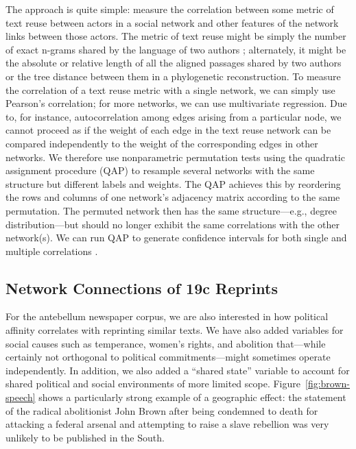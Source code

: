 \documentclass[pdftex,11pt]{article}
\begin{document}
The approach is quite simple: measure the correlation between some
metric of text reuse between actors in a social network and other
features of the network links between those actors.  The metric of
text reuse might be simply the number of exact n-grams shared by the
language of two authors \cite{margolin13:_why_simil}; alternately, it
might be the absolute or relative length of all the aligned passages
shared by two authors or the tree distance between them in a
phylogenetic reconstruction.  To measure the correlation of a text
reuse metric with a single network, we can simply use Pearson's
correlation; for more networks, we can use multivariate regression.
Due to, for instance, autocorrelation among edges arising from a
particular node, we cannot proceed as if the weight of each edge in
the text reuse network can be compared independently to the weight of
the corresponding edges in other networks.  We therefore use
nonparametric permutation tests using the quadratic assignment
procedure (QAP) to resample several networks with the same structure
but different labels and weights.  The QAP achieves this by reordering
the rows and columns of one network's adjacency matrix according to
the same permutation.  The permuted network then has the same
structure---e.g., degree distribution---but should no longer exhibit
the same correlations with the other network(s).  We can run QAP to
generate confidence intervals for both single
\cite{krackhardt87:_qap_partial_test_spurious} and multiple
correlations \cite{dekker07:_sensit_mrqap_tests_collin_autoc_condit}.

\subsection{Network Connections of 19c Reprints}
\label{sec:regress-reprint}

For the antebellum newspaper corpus, we are also interested in how
political affinity correlates with reprinting similar texts.  We have
also added variables for social causes such as temperance, women's
rights, and abolition that---while certainly not orthogonal to
political commitments---might sometimes operate independently.  In
addition, we also added a ``shared state'' variable to account for
shared political and social environments of more limited scope.
Figure~\ref{fig:brown-speech} shows a particularly strong example of a
geographic effect: the statement of the radical abolitionist John
Brown after being condemned to death for attacking a federal arsenal
and attempting to raise a slave rebellion was very unlikely to be
published in the South.
\end{document}
